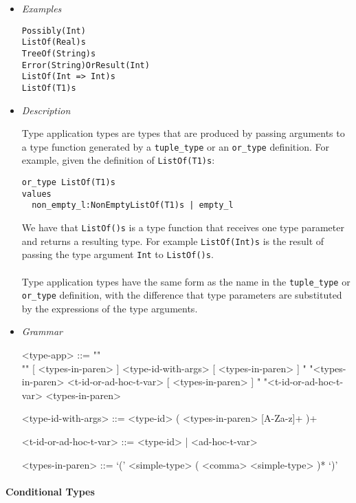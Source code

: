 \documentclass{article}
\begin{document}
\begin{itemize}
\item \textit{Examples}
\begin{verbatim}
Possibly(Int)
ListOf(Real)s
TreeOf(String)s 
Error(String)OrResult(Int)
ListOf(Int => Int)s
ListOf(T1)s
\end{verbatim}

\item \textit{Description}

Type application types are types that are produced by passing arguments
to a type function generated by a \texttt{tuple_type} or an \texttt{or_type}
definition. For example, given the definition of \texttt{ListOf(T1)s}:
\begin{verbatim}
or_type ListOf(T1)s
values
  non_empty_l:NonEmptyListOf(T1)s | empty_l
\end{verbatim}
We have that \texttt{ListOf()s} is a type function that receives one type parameter
and returns a resulting type. For example \texttt{ListOf(Int)s} is the result
of passing the type argument \texttt{Int} to \texttt{ListOf()s}.
\\\\
Type application types have the same form as the name in the
\texttt{tuple_type} or \texttt{or_type} definition, with the difference that
type parameters are substituted by the expressions of the type arguments.

\item \textit{Grammar}
\begin{grammar}
<type-app> ::= ""\\""
[ <types-in-paren> ] <type-id-with-args> [ <types-in-paren> ]
\alt " "<types-in-paren> <t-id-or-ad-hoc-t-var> [ <types-in-paren> ]
\alt " "<t-id-or-ad-hoc-t-var> <types-in-paren>

<type-id-with-args> ::= <type-id> ( <types-in-paren> [A-Za-z]+ )+

<t-id-or-ad-hoc-t-var> ::= <type-id> | <ad-hoc-t-var>

<types-in-paren> ::= `(' <simple-type> ( <comma> <simple-type> )* `)'
\end{grammar}
\end{itemize}

\paragraph{Conditional Types}
\end{document}
